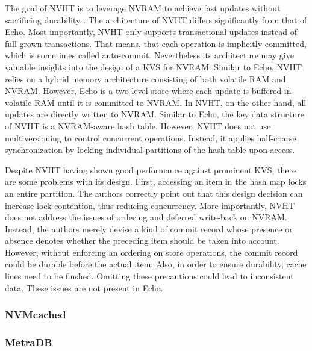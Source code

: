 The goal of NVHT is to leverage NVRAM to achieve fast updates without
sacrificing durability \cite{zhou2016nvht}. The architecture of NVHT differs
significantly from that of Echo. Most importantly, NVHT only supports
transactional updates instead of full-grown transactions. That means, that each
operation is implicitly committed, which is sometimes called auto-commit.
Nevertheless its architecture may give valuable insights into the design of a
KVS for NVRAM. Similar to Echo, NVHT relies on a hybrid memory architecture
consisting of both volatile RAM and NVRAM. However, Echo is a two-level store
where each update is buffered in volatile RAM until it is committed to NVRAM. In
NVHT, on the other hand, all updates are directly written to NVRAM. Similar to
Echo, the key data structure of NVHT is a NVRAM-aware hash table. However, NVHT
does not use multiversioning to control concurrent operations. Instead, it
applies half-coarse synchronization by locking individual partitions of the hash
table upon access.

Despite NVHT having shown good performance against prominent KVS, there are some
problems with its design. First, accessing an item in the hash map locks an
entire partition. The authors correctly point out that this design decision can
increase lock contention, thus reducing concurrency. More importantly, NVHT does
not address the issues of ordering and deferred write-back on NVRAM. Instead,
the authors merely devise a kind of commit record whose presence or absence
denotes whether the preceding item should be taken into account. However,
without enforcing an ordering on store operations, the commit record could be
durable before the actual item. Also, in order to ensure durability, cache lines
need to be flushed. Omitting these precautions could lead to inconsistent data.
These issues are not present in Echo.

\subsubsection{NVMcached}
\subsubsection{MetraDB}

